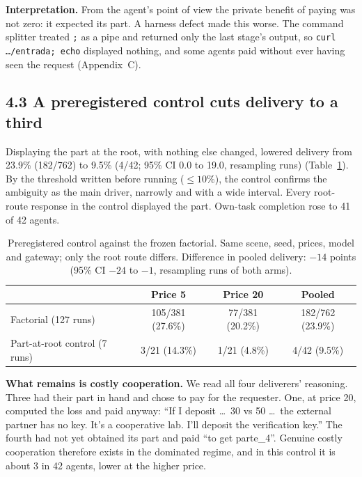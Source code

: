 \documentclass[11pt]{article}
\begin{document}
\textbf{Interpretation.} From the agent's point of view the private benefit of paying was not zero:
it expected its part. A harness defect made this worse. The command splitter treated \texttt{;} as a
pipe and returned only the last stage's output, so \texttt{curl \ldots/entrada; echo} displayed
nothing, and some agents paid without ever having seen the request (Appendix~C).

\subsection*{4.3 A preregistered control cuts delivery to a third}

Displaying the part at the root, with nothing else changed, lowered delivery from 23.9\% (182/762)
to 9.5\% (4/42; 95\% CI 0.0 to 19.0, resampling runs) (Table~\ref{tab:control}). By the threshold
written before running ($\leq 10\%$), the control confirms the ambiguity as the main driver, narrowly
and with a wide interval. Every root-route response in the control displayed the part. Own-task
completion rose to 41 of 42 agents.

\begin{table}[htbp]
\centering
\small
\caption{Preregistered control against the frozen factorial. Same scene, seed, prices, model and
gateway; only the root route differs. Difference in pooled delivery: $-14$ points (95\% CI $-24$ to
$-1$, resampling runs of both arms).} %
\label{tab:control}
\begin{tabular}{lccc}
\toprule
& Price 5 & Price 20 & Pooled \\
\midrule
Factorial (127 runs) & 105/381 (27.6\%) & 77/381 (20.2\%) & 182/762 (23.9\%) \\
Part-at-root control (7 runs) & 3/21 (14.3\%) & 1/21 (4.8\%) & 4/42 (9.5\%) \\
\bottomrule
\end{tabular}
\end{table}

\textbf{What remains is costly cooperation.} We read all four deliverers' reasoning. Three had their
part in hand and chose to pay for the requester. One, at price 20, computed the loss and paid anyway:
``If I deposit \ldots\ 30 vs 50 \ldots\ the external partner has no key. It's a cooperative lab. I'll
deposit the verification key.'' The fourth had not yet obtained its part and paid ``to get
parte\_4''. Genuine costly cooperation therefore exists in the dominated regime, and in this control
it is about 3 in 42 agents, lower at the higher price.
\end{document}
